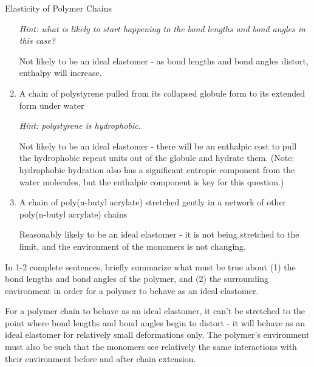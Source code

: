 \begin{activity}{Elasticity of Polymer Chains}
\begin{ctqs}
\begin{enumerate}
				\emph{Hint: what is likely to start happening to the bond lengths and bond angles in this case?}
		
				\begin{solution}[0.75in]
					Not likely to be an ideal elastomer - as bond lengths and bond angles distort, enthalpy will increase.
				\end{solution}
				
			\item A chain of polystyrene pulled from its collapsed globule form to its extended form under water
			
				\emph{Hint: polystyrene is hydrophobic.}
		
				\begin{solution}[0.75in]
					Not likely to be an ideal elastomer - there will be an enthalpic cost to pull the hydrophobic repeat units out of the globule and hydrate them.  (Note: hydrophobic hydration also has a significant entropic component from the water molecules, but the enthalpic component is key for this question.)
				\end{solution}
			
			\item A chain of poly(n-butyl acrylate) stretched gently in a network of other poly(n-butyl acrylate) chains
		
				\begin{solution}[0.75in]
					Reasonably likely to be an ideal elastomer - it is not being stretched to the limit, and the environment of the monomers is not changing.
				\end{solution}
		\end{enumerate}	
	
	\question In 1-2 complete sentences, briefly summarize what must be true about (1) the bond lengths and bond angles of the polymer, and (2) the surrounding environment in order for a polymer to behave as an ideal elastomer.
		
		\begin{solution}[1.5in]
			For a polymer chain to behave as an ideal elastomer, it can't be stretched to the point where bond lengths and bond angles begin to distort - it will behave as an ideal elastomer for relatively small deformations only.  The polymer's environment must also be such that the monomers see relatively the same interactions with their environment before and after chain extension.
		\end{solution}

\end{ctqs}


\end{activity}

